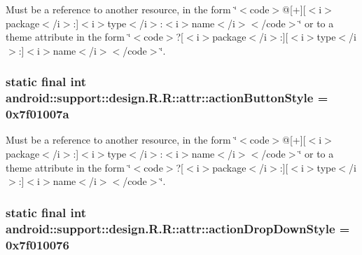 Must be a reference to another resource, in the form \char`\"{}$<$code$>$@\mbox{[}+\mbox{]}\mbox{[}$<$i$>$package$<$/i$>$:\mbox{]}$<$i$>$type$<$/i$>$:$<$i$>$name$<$/i$>$$<$/code$>$\char`\"{} or to a theme attribute in the form \char`\"{}$<$code$>$?\mbox{[}$<$i$>$package$<$/i$>$:\mbox{]}\mbox{[}$<$i$>$type$<$/i$>$:\mbox{]}$<$i$>$name$<$/i$>$$<$/code$>$\char`\"{}. \hypertarget{classandroid_1_1support_1_1design_1_1_r_1_1attr_ee8e46591656138d6e13e0bae5868629}{
\subsubsection[{actionButtonStyle}]{\setlength{\rightskip}{0pt plus 5cm}static final int android::support::design.R.R::attr::actionButtonStyle = 0x7f01007a}}
\label{classandroid_1_1support_1_1design_1_1_r_1_1attr_ee8e46591656138d6e13e0bae5868629}


Must be a reference to another resource, in the form \char`\"{}$<$code$>$@\mbox{[}+\mbox{]}\mbox{[}$<$i$>$package$<$/i$>$:\mbox{]}$<$i$>$type$<$/i$>$:$<$i$>$name$<$/i$>$$<$/code$>$\char`\"{} or to a theme attribute in the form \char`\"{}$<$code$>$?\mbox{[}$<$i$>$package$<$/i$>$:\mbox{]}\mbox{[}$<$i$>$type$<$/i$>$:\mbox{]}$<$i$>$name$<$/i$>$$<$/code$>$\char`\"{}. \hypertarget{classandroid_1_1support_1_1design_1_1_r_1_1attr_e9951649674c30f5c8647b4baf9b021a}{
\subsubsection[{actionDropDownStyle}]{\setlength{\rightskip}{0pt plus 5cm}static final int android::support::design.R.R::attr::actionDropDownStyle = 0x7f010076}}
\label{classandroid_1_1support_1_1design_1_1_r_1_1attr_e9951649674c30f5c8647b4baf9b021a}


